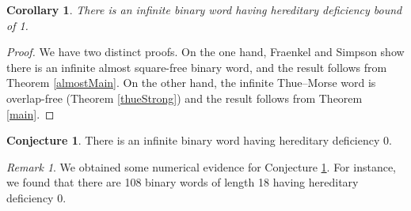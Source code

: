 \documentclass[12pt]{article}
\newcommand{\squarefree}{square-free}
\theoremstyle{plain}
\newtheorem{cor}[thm]{Corollary}
\theoremstyle{definition}
\newtheorem{con}[thm]{Conjecture}
\theoremstyle{remark}
\newtheorem{rem}[thm]{Remark}
\begin{document}
			\begin{cor}
				There is an infinite binary word having hereditary deficiency bound of 1.
			\end{cor}
			\begin{proof}
				We have two distinct proofs. On the one hand,
				Fraenkel and Simpson \cite{MR1309124} show there is an infinite almost {\squarefree} binary word,
				and the result follows from Theorem \ref{almostMain}.
				On the other hand, the infinite Thue--Morse word is overlap-free (Theorem \ref{thueStrong})
				and the result follows from Theorem \ref{main}.
			\end{proof}
			\begin{con}\label{evidence}
				There is an infinite binary word having hereditary deficiency 0.
			\end{con}
			\begin{rem}
				We obtained some numerical evidence for Conjecture \ref{evidence}.
				For instance, we found that there are 108 binary words of length 18 having hereditary deficiency 0.
			\end{rem}
\def\cprime{}
\end{document}
